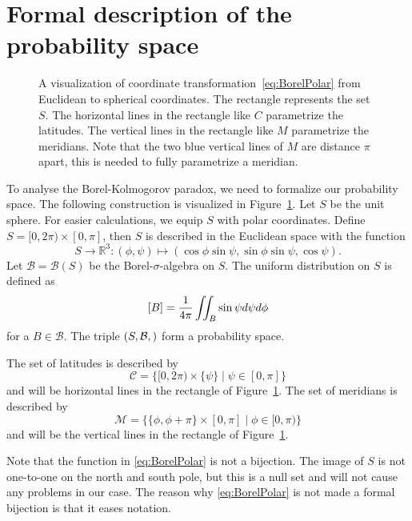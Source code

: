 \documentclass[a4paper]{report}
\theoremstyle{plain}
\theoremstyle{definition}
\theoremstyle{remark}
\numberwithin{equation}{chapter}
\newcommand{\R}{\mathbb{R}}
\let\P\relax
\DeclareMathOperator{\P}{\mathbb{P}}
\DeclareMathOperator{\1}{\mathbbm{1}}
\newcommand{\B}{\mathcal{B}}
\begin{document}
\section{Formal description of the probability space}
\begin{figure}
\centering{

}
\caption{A visualization of coordinate transformation~\eqref{eq:BorelPolar} from Euclidean to spherical coordinates. The rectangle represents the set $S$. The horizontal lines in the rectangle like $C$ parametrize the latitudes. The vertical lines in the rectangle like $M$ parametrize the meridians. Note that the two blue vertical lines of $M$ are distance $\pi$ apart, this is needed to fully parametrize a meridian.}
\label{fig:BorelVis}
\end{figure}

To analyse the Borel-Kolmogorov paradox, we need to formalize our probability space. The following construction is visualized in Figure~\ref{fig:BorelVis}. Let $S$ be the unit sphere. For easier calculations, we equip $S$ with polar coordinates. Define $S=[0,2\pi)\times[0,\pi]$, then $S$ is described in the Euclidean space with the function
\begin{equation}\label{eq:BorelPolar}
S\to\R^3:(\phi,\psi)\mapsto(\cos\phi\sin\psi,\sin\phi\sin\psi,\cos\psi).
\end{equation}
Let $\B=\B(S)$ be the Borel-$\sigma$-algebra on $S$. The uniform distribution on $S$ is defined as
\begin{equation}
\P[B]=\frac{1}{4\pi}\iint_B\sin\psi d\psi d\phi
\end{equation}
for a $B\in\B$. The triple $(S,\B,\P)$ form a probability space.

The set of latitudes is described by
\begin{equation}
\mathcal{C}=\{[0,2\pi)\times\{\psi\}\mid\psi\in[0,\pi]\}
\end{equation}
and will be horizontal lines in the rectangle of Figure~\ref{fig:BorelVis}. The set of meridians is described by
\begin{equation}
\mathcal{M}=\{\{\phi,\phi+\pi\}\times[0,\pi]\mid\phi\in[0,\pi)\}
\end{equation}
and will be the vertical lines in the rectangle of Figure~\ref{fig:BorelVis}.

Note that the function in \eqref{eq:BorelPolar} is not a bijection. The image of $S$ is not one-to-one on the north and south pole, but this is a null set and will not cause any problems in our case. The reason why \eqref{eq:BorelPolar} is not made a formal bijection is that it eases notation.
\end{document}
